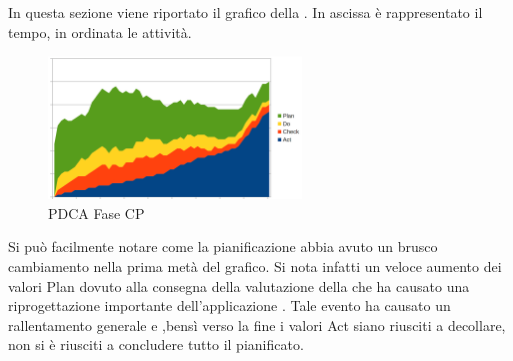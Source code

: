 In questa sezione viene riportato il grafico  della . In ascissa è rappresentato il tempo, in ordinata le attività.

\begin{figure}[H]
	\centering
	\includegraphics[width=0.6\textwidth]{PianoDiQualifica/Pics/GraficoPDCAFaseCP.png}
	\caption{PDCA Fase CP}
\end{figure}
Si può facilmente notare come la pianificazione abbia avuto un brusco cambiamento nella prima metà del grafico. Si nota infatti un veloce aumento dei valori Plan dovuto alla consegna della valutazione della  che ha causato una riprogettazione importante dell'applicazione . Tale evento ha causato un rallentamento generale e ,bensì verso la fine i valori Act siano riusciti a decollare, non si è riusciti a concludere tutto il pianificato.
